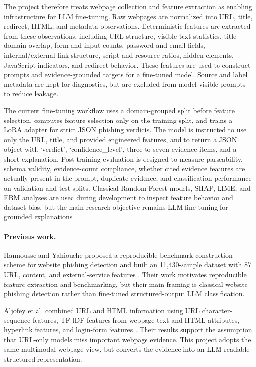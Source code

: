 \documentclass[12pt,letterpaper]{article}
\begin{document}
The project therefore treats webpage collection and feature extraction as enabling infrastructure for LLM fine-tuning. Raw webpages are normalized into URL, title, redirect, HTML, and metadata observations. Deterministic features are extracted from these observations, including URL structure, visible-text statistics, title-domain overlap, form and input counts, password and email fields, internal/external link structure, script and resource ratios, hidden elements, JavaScript indicators, and redirect behavior. These features are used to construct prompts and evidence-grounded targets for a fine-tuned model. Source and label metadata are kept for diagnostics, but are excluded from model-visible prompts to reduce leakage.

The current fine-tuning workflow uses a domain-grouped split before feature selection, computes feature selection only on the training split, and trains a LoRA adapter for strict JSON phishing verdicts. The model is instructed to use only the URL, title, and provided engineered features, and to return a JSON object with `verdict', `confidence\_level', three to seven evidence items, and a short explanation. Post-training evaluation is designed to measure parseability, schema validity, evidence-count compliance, whether cited evidence features are actually present in the prompt, duplicate evidence, and classification performance on validation and test splits. Classical Random Forest models, SHAP, LIME, and EBM analyses are used during development to inspect feature behavior and dataset bias, but the main research objective remains LLM fine-tuning for grounded explanations.

\paragraph{Previous work.}
Hannousse and Yahiouche proposed a reproducible benchmark construction scheme for website phishing detection and built an 11,430-sample dataset with 87 URL, content, and external-service features \cite{hannousse2021}. Their work motivates reproducible feature extraction and benchmarking, but their main framing is classical website phishing detection rather than fine-tuned structured-output LLM classification.

Aljofey et al. combined URL and HTML information using URL character-sequence features, TF-IDF features from webpage text and HTML attributes, hyperlink features, and login-form features \cite{aljofey2022}. Their results support the assumption that URL-only models miss important webpage evidence. This project adopts the same multimodal webpage view, but converts the evidence into an LLM-readable structured representation.
\end{document}
